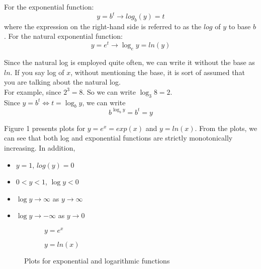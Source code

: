 \documentclass{./../Latex/handout}
\begin{document}
For the exponential function: 
\[ y=b^{t} \rightarrow log_b(y) = t  \]
where the expression on the right-hand side is referred to as the $log$ of $y$ to base $b$. For the natural exponential function:
\[y=e^{t} \rightarrow \log _{e} y =ln(y) \]

Since the natural log is employed quite often, we can write it without the base as $ln$. If you say log of $x$, without mentioning the base, it is sort of assumed that you are talking about the natural log. \\

For example, since $2^{3}=8$. So we can write $\log _{3} 8=2$. \\

Since $y=b^{t} \Longleftrightarrow t=\log _{b} y$, we can write
$$
b^{\log _{b} y}=b^{t}=y
$$

Figure 1 presents plots for $y = e^x = exp(x)$ and $y=ln(x)$. From the plots, we can see that both log and exponential functions are strictly monotonically increasing. In addition,
\begin{itemize}
	\item $y=1$, $log(y) = 0$
	\item $0<y<1$,  $\log y<0$
	\item $\log y \rightarrow \infty$ as $y \rightarrow \infty$
	\item $\log y \rightarrow-\infty$ as $y \rightarrow 0$
\end{itemize}


\pgfplotsset{%
    width=7cm,
    height=6cm
}
\begin{figure*}[t]
\begin{subfigure}[b]{0.5\textwidth}
\caption{$y = e^x$}
\end{subfigure}
\begin{subfigure}[b]{0.5\textwidth}
\caption{$y =ln(x)$}
\end{subfigure}
\caption{Plots for exponential and logarithmic functions}
\end{figure*}
\end{document}
